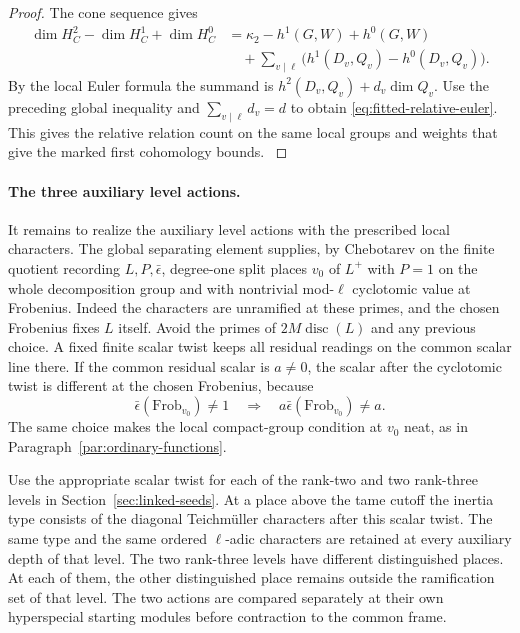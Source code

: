 \begin{proof}
The cone sequence gives
\begin{align*}
 \dim H_C^2-\dim H_C^1+\dim H_C^0
   &=\kappa_2-h^1(G,W)+h^0(G,W)\\
   &\quad+\sum_{v\mid\ell}\bigl(h^1(D_v,Q_v)-h^0(D_v,Q_v)\bigr).
\end{align*}
By the local Euler formula the summand is
\(h^2(D_v,Q_v)+d_v\dim Q_v\). Use the preceding global
inequality and \(\sum_{v\mid\ell}d_v=d\) to obtain
\eqref{eq:fitted-relative-euler}. This gives the relative
relation count on the same local groups and weights that
give the marked first cohomology bounds.
\cite{milne-duality}\label{cor:ordinary-fitted-arithmetic-4}

\end{proof}

\paragraph{The three auxiliary level actions.}
It remains to realize the auxiliary level actions with the prescribed local
characters. The global separating element supplies, by Chebotarev on
the finite quotient recording \(L,P,\bar\epsilon\), degree-one
split places \(v_0\) of \(L^+\) with \(P=1\) on the whole
decomposition group and with nontrivial mod-\(\ell\) cyclotomic
value at Frobenius. Indeed the characters are unramified at
these primes, and the chosen Frobenius fixes \(L\) itself.
Avoid the primes of \(2M\operatorname{disc}(L)\) and any
previous choice. A fixed finite scalar twist keeps all
residual readings on the common scalar line there. If the common residual scalar is \(a\ne0\), the scalar after the cyclotomic twist is different at the chosen Frobenius, because
\[
 \bar\epsilon(\mathrm{Frob}_{v_0})\ne1\quad\Longrightarrow\quad a\bar\epsilon(\mathrm{Frob}_{v_0})\ne a.
\] The same choice makes the local compact-group
condition at \(v_0\) neat, as in
Paragraph~\ref{par:ordinary-functions}.

Use the appropriate scalar twist for each of the rank-two
and two rank-three levels in Section~\ref{sec:linked-seeds}.
At a place above the tame cutoff the inertia type consists
of the diagonal Teichm\"uller characters after this scalar
twist. The same type and the same ordered \(\ell\)-adic
characters are retained at every auxiliary depth of that
level. The two rank-three levels have different
distinguished places. At each of them, the other
distinguished place remains outside the ramification set
of that level. The two actions are compared separately at
their own hyperspecial starting modules before contraction
to the common frame.

